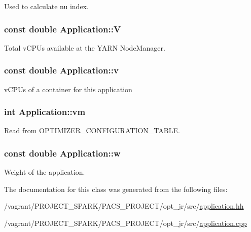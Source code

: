 Used to calculate nu index. 

\hypertarget{classApplication_a03a99fa3553c376653e53bb5f489c316}{
\subsubsection[{V}]{\setlength{\rightskip}{0pt plus 5cm}const double Application\-::\-V\hspace{0.3cm}{\ttfamily [private]}}}\label{classApplication_a03a99fa3553c376653e53bb5f489c316}


Total v\-C\-P\-Us available at the Y\-A\-R\-N Node\-Manager. 

\hypertarget{classApplication_a57853498c230af817bc4173169847bfc}{
\subsubsection[{v}]{\setlength{\rightskip}{0pt plus 5cm}const double Application\-::v\hspace{0.3cm}{\ttfamily [private]}}}\label{classApplication_a57853498c230af817bc4173169847bfc}


v\-C\-P\-Us of a container for this application 

\hypertarget{classApplication_a0a3fe386eb8244e536bc5297709d1269}{
\subsubsection[{vm}]{\setlength{\rightskip}{0pt plus 5cm}int Application\-::vm\hspace{0.3cm}{\ttfamily [private]}}}\label{classApplication_a0a3fe386eb8244e536bc5297709d1269}


Read from O\-P\-T\-I\-M\-I\-Z\-E\-R\-\_\-\-C\-O\-N\-F\-I\-G\-U\-R\-A\-T\-I\-O\-N\-\_\-\-T\-A\-B\-L\-E. 

\hypertarget{classApplication_a89e171cf287b09ce4b37dd94c0d61e2b}{
\subsubsection[{w}]{\setlength{\rightskip}{0pt plus 5cm}const double Application\-::w\hspace{0.3cm}{\ttfamily [private]}}}\label{classApplication_a89e171cf287b09ce4b37dd94c0d61e2b}


Weight of the application. 



The documentation for this class was generated from the following files\-:\begin{DoxyCompactItemize}
\item 
/vagrant/\-P\-R\-O\-J\-E\-C\-T\-\_\-\-S\-P\-A\-R\-K/\-P\-A\-C\-S\-\_\-\-P\-R\-O\-J\-E\-C\-T/opt\-\_\-jr/src/\hyperlink{application_8hh}{application.\-hh}\item 
/vagrant/\-P\-R\-O\-J\-E\-C\-T\-\_\-\-S\-P\-A\-R\-K/\-P\-A\-C\-S\-\_\-\-P\-R\-O\-J\-E\-C\-T/opt\-\_\-jr/src/\hyperlink{application_8cpp}{application.\-cpp}\end{DoxyCompactItemize}
